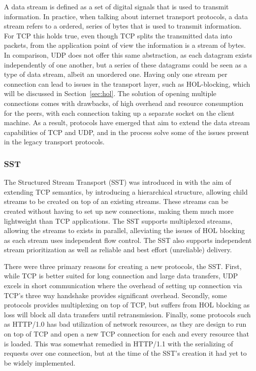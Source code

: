 \documentclass[english, 12pt, a4paper, elec, utf8, a-2b, online]{aaltothesis}
\begin{document}
A data stream is defined as a set of digital signals that is used to transmit
information\cite{data_stream}. In practice, when talking about internet
transport protocols, a data stream refers to a ordered, series of bytes that is
used to transmit information. For TCP this holds true, even though TCP splits
the transmitted data into packets, from the application point of view the
information is a stream of bytes. In comparison, UDP does not offer this same
abstraction, as each datagram exists independently of one another, but a series
of these datagrams could be seen as a type of data stream, albeit an unordered one.
Having only one stream per connection can lead to issues in the transport layer, such as HOL-blocking,
which will be discussed in Section~\ref{sec:hol}. The solution of opening multiple
connections comes with drawbacks, of high overhead and resource consumption for
the peers, with each connection taking up a separate socket on the client machine.
As a result, protocols have emerged that aim to extend the data stream capabilities
of TCP and UDP, and in the process solve some of the issues present in the legacy
transport protocols.
\subsubsection{SST}

The Structured Stream Transport (SST) was introduced in \cite{sst} with the aim
of extending TCP semantics, by introducing a hierarchical structure, allowing
child streams to be created on top of an existing streams. These streams can
be created without having to set up new connections, making them much more lightweight
than TCP applications. The SST supports multiplexed streams, allowing the streams
to exists in parallel, alleviating the issues of HOL blocking as each stream uses
independent flow control. The SST also supports independent stream prioritization
as well as reliable and best effort (unreliable) delivery\cite{sst}.

There were three primary reasons for creating a new protocols, the SST. First, while
TCP is better suited for long connection and large data transfers, UDP excels
in short communication where the overhead of setting up connection via TCP's three
way handshake provides significant overhead. Secondly, some protocols provides
multiplexing on top of TCP, but suffers from HOL blocking as loss will block all
data transfers until retransmission. Finally, some protocols such as HTTP/1.0
has bad utilization of network resources, as they are design to run on top of TCP
and open a new TCP connection for each and every resource that is loaded. This
was somewhat remedied in HTTP/1.1 with the serializing of requests over one connection,
but at the time of the SST's creation it had yet to be widely implemented\cite{sst}.
\end{document}
